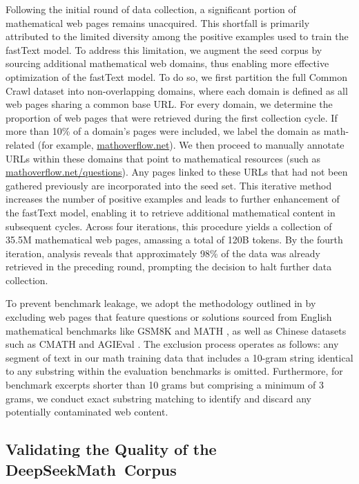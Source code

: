 \begin{itemize}[topsep=0pt]
Following the initial round of data collection, a significant portion of mathematical web pages remains unacquired. This shortfall is primarily attributed to the limited diversity among the positive examples used to train the fastText model. To address this limitation, we augment the seed corpus by sourcing additional mathematical web domains, thus enabling more effective optimization of the fastText model. To do so, we first partition the full Common Crawl dataset into non-overlapping domains, where each domain is defined as all web pages sharing a common base URL. For every domain, we determine the proportion of web pages that were retrieved during the first collection cycle. If more than 10\% of a domain’s pages were included, we label the domain as math-related (for example, \url{mathoverflow.net}). We then proceed to manually annotate URLs within these domains that point to mathematical resources (such as \url{mathoverflow.net/questions}). Any pages linked to these URLs that had not been gathered previously are incorporated into the seed set. This iterative method increases the number of positive examples and leads to further enhancement of the fastText model, enabling it to retrieve additional mathematical content in subsequent cycles. Across four iterations, this procedure yields a collection of 35.5M mathematical web pages, amassing a total of 120B tokens. By the fourth iteration, analysis reveals that approximately 98\% of the data was already retrieved in the preceding round, prompting the decision to halt further data collection.

To prevent benchmark leakage, we adopt the methodology outlined in \cite{deepseek-coder} by excluding web pages that feature questions or solutions sourced from English mathematical benchmarks like GSM8K \citep{gsm8k} and MATH \citep{MATH}, as well as Chinese datasets such as CMATH \citep{wei2023cmath} and AGIEval \citep{agieval}. The exclusion process operates as follows: any segment of text in our math training data that includes a 10-gram string identical to any substring within the evaluation benchmarks is omitted. Furthermore, for benchmark excerpts shorter than 10 grams but comprising a minimum of 3 grams, we conduct exact substring matching to identify and discard any potentially contaminated web content.

\subsection{Validating the Quality of the DeepSeekMath~Corpus}


\end{itemize}
